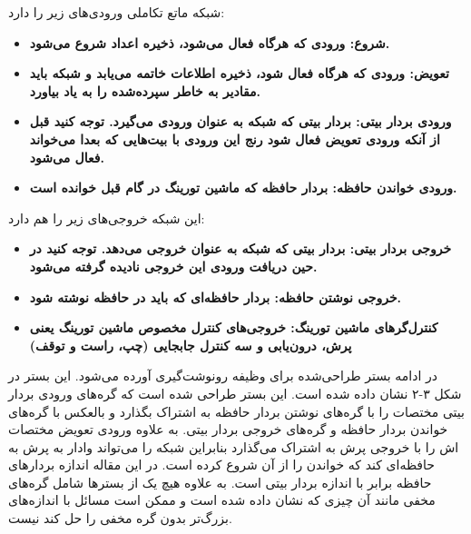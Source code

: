 شبکه ماتع تکاملی ورودی‌های زیر را دارد:
\begin{itemize}
\item \bf{شروع}: ورودی که هرگاه فعال می‌شود، ذخیره اعداد شروع می‌شود.
\item \bf{تعویض}: ورودی که هرگاه فعال شود، ذخیره اطلاعات خاتمه می‌یابد و شبکه باید مقادیر به خاطر سپرده‌شده را به یاد بیاورد.
\item \bf{ورودی بردار بیتی}: بردار بیتی که شبکه به عنوان ورودی می‌گیرد. توجه کنید قبل از آنکه ورودی تعویض فعال شود رنج این ورودی با بیت‌هایی که بعدا می‌خواند فعال می‌شود.
\item \bf{ورودی خواندن حافظه}: بردار حافظه که ماشین تورینگ در گام قبل خوانده است.\cite{merrild2018hyperntm}
\end{itemize}

این شبکه خروجی‌های زیر را هم دارد:
\begin{itemize}
\item \bf{خروجی بردار بیتی}: بردار بیتی که شبکه به عنوان خروجی می‌دهد. توجه کنید در حین دریافت ورودی این خروجی نادیده گرفته می‌شود.
\item \bf{خروجی نوشتن حافظه}: بردار حافظه‌ای که باید در حافظه نوشته شود.
\item \bf{کنترل‌گر‌های ماشین تورینگ}: خروجی‌های کنترل مخصوص ماشین تورینگ یعنی پرش، درون‌یابی و سه کنترل جابجایی (چپ، راست و توقف)\cite{merrild2018hyperntm} 
\end{itemize}

در ادامه بستر طراحی‌شده برای وظیفه رونوشت‌گیری آورده می‌شود. این بستر در شکل ۳-۲ نشان داده شده است. این بستر طراحی شده است که گره‌های ورودی بردار بیتی مختصات  را با گره‌های نوشتن بردار حافظه به اشتراک بگذارد و بالعکس با گره‌های خواندن بردار حافظه و گره‌های خروجی بردار بیتی.
به علاوه ورودی تعویض مختصات  اش را با خروجی پرش به اشتراک می‌گذارد بنابراین شبکه را می‌تواند وادار به پرش به حافظه‌ای کند که خواندن را از آن شروع کرده است. در این مقاله اندازه بردارهای حافظه برابر با اندازه بردار بیتی است. 
به علاوه هیچ یک از بسترها شامل گره‌های مخفی مانند آن چیزی که نشان داده شده است و ممکن است مسائل  با اندازه‌های بزرگ‌تر بدون گره مخفی را حل کند نیست.\cite{merrild2018hyperntm}


